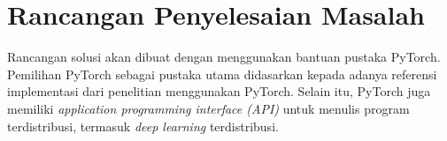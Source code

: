 \section{Rancangan Penyelesaian Masalah}
Rancangan solusi akan dibuat dengan menggunakan bantuan pustaka PyTorch. Pemilihan PyTorch sebagai pustaka utama didasarkan kepada adanya referensi implementasi dari penelitian \textcite{Chen2021CADA} menggunakan PyTorch. Selain itu, PyTorch juga memiliki \emph{application programming interface (API)} untuk menulis program terdistribusi, termasuk \emph{deep learning} terdistribusi.
